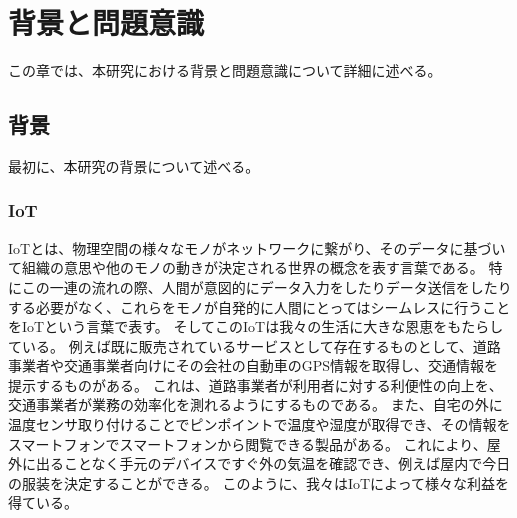 \chapter{背景と問題意識}
この章では、本研究における背景と問題意識について詳細に述べる。

\section{背景}
最初に、本研究の背景について述べる。

\subsection{IoT}
IoTとは、物理空間の様々なモノがネットワークに繋がり、そのデータに基づいて組織の意思や他のモノの動きが決定される世界の概念を表す言葉である。
特にこの一連の流れの際、人間が意図的にデータ入力をしたりデータ送信をしたりする必要がなく、これらをモノが自発的に人間にとってはシームレスに行うことをIoTという言葉で表す。
そしてこのIoTは我々の生活に大きな恩恵をもたらしている。
例えば既に販売されているサービスとして存在するものとして、道路事業者や交通事業者向けにその会社の自動車のGPS情報を取得し、交通情報を提示するものがある。\cite{hitachi_traffic}
これは、道路事業者が利用者に対する利便性の向上を、交通事業者が業務の効率化を測れるようにするものである。
また、自宅の外に温度センサ取り付けることでピンポイントで温度や湿度が取得でき、その情報をスマートフォンでスマートフォンから閲覧できる製品がある。\cite{thermometer}
これにより、屋外に出ることなく手元のデバイスですぐ外の気温を確認でき、例えば屋内で今日の服装を決定することができる。
このように、我々はIoTによって様々な利益を得ている。

